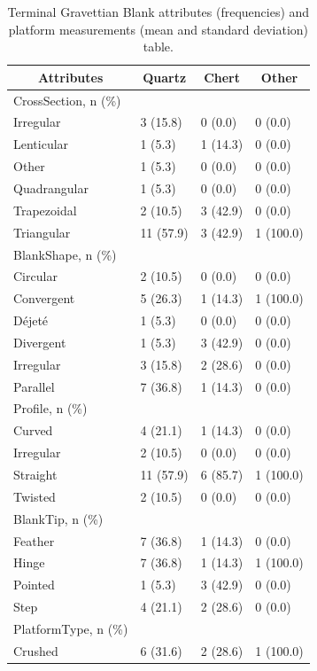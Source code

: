 \documentclass[12pt,twoside]{reedthesis}
\begin{document}
\begin{longtable}[t]{llll}
\caption{\label{tab:unnamed-chunk-74}Terminal Gravettian Blank attributes (frequencies) and platform measurements (mean and standard deviation) table.}\\
\toprule
\multicolumn{1}{c}{\textbf{Attributes}} & \multicolumn{1}{c}{\textbf{Quartz}} & \multicolumn{1}{c}{\textbf{Chert}} & \multicolumn{1}{c}{\textbf{Other}}\\
\midrule
CrossSection, n (\%) &  &  & \\
Irregular & 3 (15.8) & 0 (0.0) & 0 (0.0)\\
Lenticular & 1 (5.3) & 1 (14.3) & 0 (0.0)\\
Other & 1 (5.3) & 0 (0.0) & 0 \vphantom{1} (0.0)\\
Quadrangular & 1 (5.3) & 0 (0.0) & 0 (0.0)\\
\addlinespace
Trapezoidal & 2 (10.5) & 3 (42.9) & 0 (0.0)\\
Triangular & 11 (57.9) & 3 (42.9) & 1 (100.0)\\
BlankShape, n (\%) &  &  & \\
Circular & 2 (10.5) & 0 (0.0) & 0 (0.0)\\
Convergent & 5 (26.3) & 1 (14.3) & 1 (100.0)\\
\addlinespace
Déjeté & 1 (5.3) & 0 (0.0) & 0 (0.0)\\
Divergent & 1 (5.3) & 3 (42.9) & 0 (0.0)\\
Irregular & 3 (15.8) & 2 (28.6) & 0 (0.0)\\
Parallel & 7 (36.8) & 1 (14.3) & 0 (0.0)\\
Profile, n (\%) &  &  & \\
\addlinespace
Curved & 4 (21.1) & 1 (14.3) & 0 (0.0)\\
Irregular & 2 (10.5) & 0 (0.0) & 0 (0.0)\\
Straight & 11 (57.9) & 6 (85.7) & 1 (100.0)\\
Twisted & 2 (10.5) & 0 (0.0) & 0 (0.0)\\
BlankTip, n (\%) &  &  & \\
\addlinespace
Feather & 7 (36.8) & 1 (14.3) & 0 (0.0)\\
Hinge & 7 (36.8) & 1 (14.3) & 1 (100.0)\\
Pointed & 1 (5.3) & 3 (42.9) & 0 (0.0)\\
Step & 4 (21.1) & 2 (28.6) & 0 (0.0)\\
PlatformType, n (\%) &  &  & \\
\addlinespace
Crushed & 6 (31.6) & 2 (28.6) & 1 (100.0)\\

\end{longtable}
\end{document}
